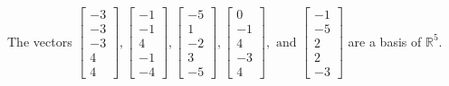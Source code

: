 \begin{exercise}
\begin{exerciseStatement}
  \end{exerciseStatement}
  \begin{exerciseAnswer}
   The vectors \(\left[\begin{array}{r}
-3 \\
-3 \\
-3 \\
4 \\
4
\end{array}\right] , \left[\begin{array}{r}
-1 \\
-1 \\
4 \\
-1 \\
-4
\end{array}\right] , \left[\begin{array}{r}
-5 \\
1 \\
-2 \\
3 \\
-5
\end{array}\right] , \left[\begin{array}{r}
0 \\
-1 \\
4 \\
-3 \\
4
\end{array}\right] , \text{ and } \left[\begin{array}{r}
-1 \\
-5 \\
2 \\
2 \\
-3
\end{array}\right]\) 
  	 are  a basis of \(\mathbb{R}^5\).
  


  \end{exerciseAnswer}
\end{exercise}